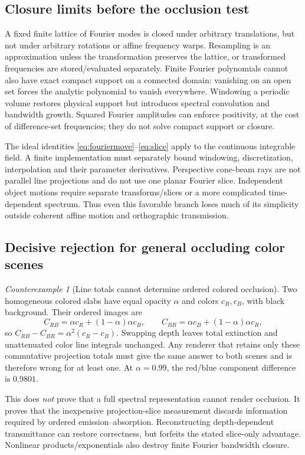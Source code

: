 \documentclass[10pt,letterpaper]{article}
\theoremstyle{remark}\newtheorem{counterexample}[proposition]{Counterexample}
\begin{document}
\subsection{Closure limits before the occlusion test}
A fixed finite lattice of Fourier modes is closed under arbitrary translations, but not under arbitrary rotations or affine frequency warps. Resampling is an approximation unless the transformation preserves the lattice, or transformed frequencies are stored/evaluated separately. Finite Fourier polynomials cannot also have exact compact support on a connected domain: vanishing on an open set forces the analytic polynomial to vanish everywhere. Windowing a periodic volume restores physical support but introduces spectral convolution and bandwidth growth. Squared Fourier amplitudes can enforce positivity, at the cost of difference-set frequencies; they do not solve compact support or closure.

The ideal identities \eqref{eq:fouriermove}--\eqref{eq:slice} apply to the continuous integrable field. A finite implementation must separately bound windowing, discretization, interpolation and their parameter derivatives. Perspective cone-beam rays are not parallel line projections and do not use one planar Fourier slice. Independent object motions require separate transforms/slices or a more complicated time-dependent spectrum. Thus even this favorable branch loses much of its simplicity outside coherent affine motion and orthographic transmission.

\subsection{Decisive rejection for general occluding color scenes}
\begin{counterexample}[Line totals cannot determine ordered colored occlusion]
Two homogeneous colored slabs have equal opacity $\alpha$ and colors $c_R,c_B$, with black background. Their ordered images are
\begin{equation}
 C_{RB}=\alpha c_R+(1-\alpha)\alpha c_B,\qquad
 C_{BR}=\alpha c_B+(1-\alpha)\alpha c_R,
\end{equation}
so $C_{RB}-C_{BR}=\alpha^2(c_R-c_B)$. Swapping depth leaves total extinction and unattenuated color line integrals unchanged. Any renderer that retains only these commutative projection totals must give the same answer to both scenes and is therefore wrong for at least one. At $\alpha=0.99$, the red/blue component difference is $0.9801$.
\end{counterexample}
This does \emph{not} prove that a full spectral representation cannot render occlusion. It proves that the inexpensive projection-slice measurement discards information required by ordered emission--absorption. Reconstructing depth-dependent transmittance can restore correctness, but forfeits the stated slice-only advantage. Nonlinear products/exponentials also destroy finite Fourier bandwidth closure.
\end{document}
